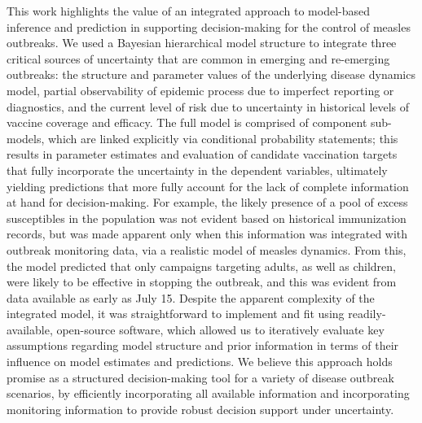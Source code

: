This work highlights the value of an integrated approach to model-based inference and prediction in supporting decision-making for the control of measles outbreaks. We used a Bayesian hierarchical model structure to integrate three critical sources of uncertainty that are common in emerging and re-emerging outbreaks: the structure and parameter values of the underlying disease dynamics model, partial observability of epidemic process due to imperfect reporting or diagnostics, and the current level of risk due to uncertainty in historical levels of vaccine coverage and efficacy. The full model is comprised of component sub-models, which are linked explicitly via conditional probability statements; this results in parameter estimates and evaluation of candidate vaccination targets that fully incorporate the uncertainty in the dependent variables, ultimately yielding predictions that more fully account for the lack of complete information at hand for decision-making. For example, the likely presence of a pool of excess susceptibles in the population was not evident based on historical immunization records, but was made apparent only when this information was integrated with outbreak monitoring data, via a realistic model of measles dynamics. From this, the model predicted that only campaigns targeting adults, as well as children, were likely to be effective in stopping the outbreak, and this was evident from data available as early as July 15. Despite the apparent complexity of the integrated model, it was straightforward to implement and fit using readily-available, open-source software, which allowed us to iteratively evaluate key assumptions regarding model structure and prior information in terms of their influence on model estimates and predictions. We believe this approach holds promise as a structured decision-making tool for a variety of disease outbreak scenarios, by efficiently incorporating all available information and incorporating monitoring information to provide robust decision support under uncertainty.

